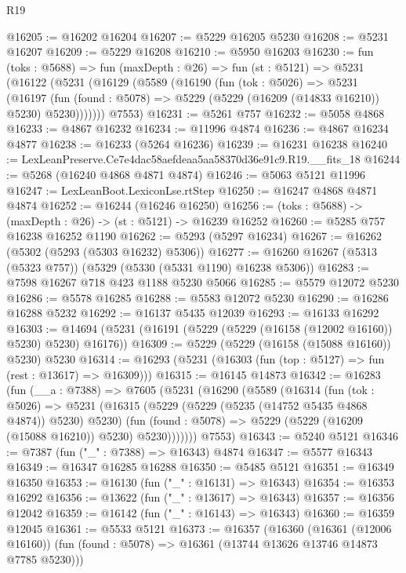 \begin{lexlean}{R19}
\begin{coremodule}
@16205 := @16202 @16204
@16207 := @5229 @16205 @5230
@16208 := @5231 @16207
@16209 := @5229 @16208
@16210 := @5950 @16203
@16230 := fun (toks : @5688) =>
  fun (maxDepth : @26) =>
  fun (st : @5121) =>
  @5231
    (@16122
      (@5231
        (@16129
          (@5589
            (@16190
              (fun (tok : @5026) =>
              @5231
                (@16197
                  (fun (found : @5078) => @5229 (@5229 (@16209 (@14833 @16210)) @5230) @5230)))))))
      @7553)
@16231 := @5261 @757
@16232 := @5058 @4868
@16233 := @4867 @16232
@16234 := @11996 @4874
@16236 := @4867 @16234 @4877
@16238 := @16233 (@5264 @16236)
@16239 := @16231 @16238
@16240 := LexLeanPreserve.Ce7e4dac58aefdeaa5aa58370d36e91c9.R19.__fits_18
@16244 := @5268 (@16240 @4868 @4871 @4874)
@16246 := @5063 @5121 @11996
@16247 := LexLeanBoot.LexiconLse.rtStep
@16250 := @16247 @4868 @4871 @4874
@16252 := @16244 (@16246 @16250)
@16256 := (toks : @5688) -> (maxDepth : @26) -> (st : @5121) -> @16239 @16252
@16260 := @5285 @757 @16238 @16252 @1190
@16262 := @5293 (@5297 @16234)
@16267 := @16262 (@5302 (@5293 (@5303 @16232) @5306))
@16277 := @16260 @16267 (@5313 (@5323 @757)) (@5329 (@5330 (@5331 @1190) @16238 @5306))
@16283 := @7598 @16267 @718 @423 @1188 @5230 @5066
@16285 := @5579 @12072 @5230
@16286 := @5578 @16285
@16288 := @5583 @12072 @5230
@16290 := @16286 @16288 @5232
@16292 := @16137 @5435 @12039
@16293 := @16133 @16292
@16303 := @14694 (@5231 (@16191 (@5229 (@5229 (@16158 (@12002 @16160)) @5230) @5230) @16176))
@16309 := @5229 (@5229 (@16158 (@15088 @16160)) @5230) @5230
@16314 := @16293 (@5231 (@16303 (fun (top : @5127) => fun (rest : @13617) => @16309)))
@16315 := @16145 @14873
@16342 := @16283
    (fun (__a : @7388) =>
    @7605
      (@5231
        (@16290
          (@5589
            (@16314
              (fun (tok : @5026) =>
              @5231
                (@16315
                  (@5229 (@5229 (@5235 (@14752 @5435 @4868 @4874)) @5230) @5230)
                  (fun (found : @5078) => @5229 (@5229 (@16209 (@15088 @16210)) @5230) @5230)))))))
      @7553)
@16343 := @5240 @5121
@16346 := @7387 (fun ("_" : @7388) => @16343) @4874
@16347 := @5577 @16343
@16349 := @16347 @16285 @16288
@16350 := @5485 @5121
@16351 := @16349 @16350
@16353 := @16130 (fun ("_" : @16131) => @16343)
@16354 := @16353 @16292
@16356 := @13622 (fun ("_" : @13617) => @16343)
@16357 := @16356 @12042
@16359 := @16142 (fun ("_" : @16143) => @16343)
@16360 := @16359 @12045
@16361 := @5533 @5121
@16373 := @16357
    (@16360
      (@16361 (@12006 @16160))
      (fun (found : @5078) => @16361 (@13744 @13626 @13746 @14873 @7785 @5230)))

\end{coremodule}
\end{lexlean}
